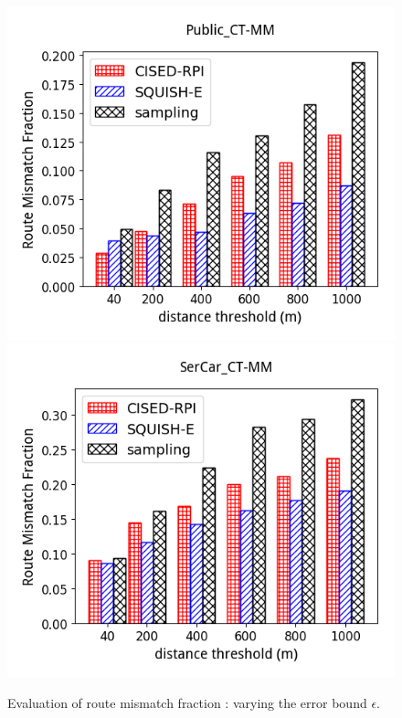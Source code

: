 \begin{figure}[tb!]
	\centering
  \includegraphics[height=0.3\textwidth]{Figures/Exp-epsilon-rmf-cmp_tc_CT-MM-Public.png}\hspace{5ex}
  \includegraphics[height=0.3\textwidth]{Figures/Exp-epsilon-rmf-cmp_tc_CT-MM-SerCar.png}\hspace{5ex}
	\vspace{-2.5ex}
  \caption{\small Evaluation of route mismatch fraction : varying the error bound $\epsilon$.}
	\label{fig:rmf-epsilon}
	\vspace{-2ex}
\end{figure}






